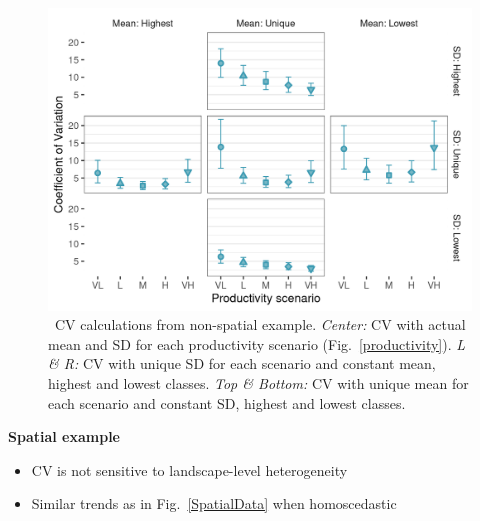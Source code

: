 \begin{frame}[t]
\begin{columns}[t]
\begin{column}{\twocolwid}
\begin{columns}[T]
\begin{column}{0.6\textwidth}
\begin{figure}
	\begin{center}
		\includegraphics[width=1.5\maxwidth]{figure/NonSpatialResults}
		\caption{~CV calculations from non-spatial example. 
			\emph{Center:} CV with actual mean and SD for each productivity scenario (Fig.~\ref{productivity}). 
			\emph{L \& R:} CV with unique SD for each scenario and constant mean, highest and lowest classes. 
			\emph{Top \& Bottom:} CV with unique mean for each scenario and constant SD, highest and lowest classes.}
		\label{NonSpatialExample}
	\end{center}
\end{figure}

\textbf{Spatial example} 

\begin{itemize}
	\item CV is not sensitive to landscape-level heterogeneity
	\item Similar trends as in Fig.~\ref{SpatialData} when homoscedastic
\end{itemize} 


\end{column}
\end{columns}
\end{column}
\end{columns}
\end{frame}
